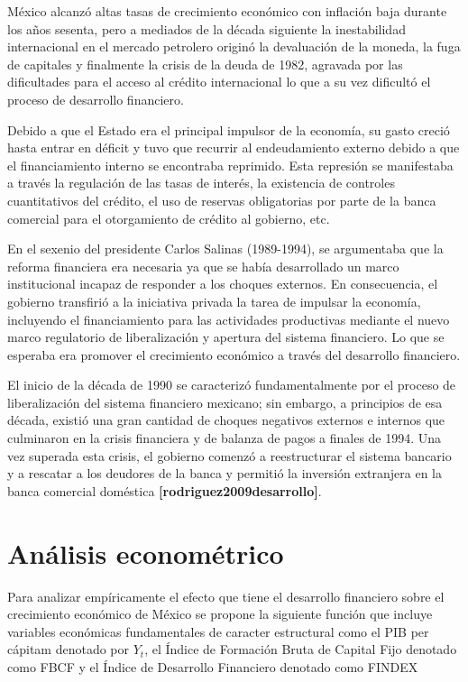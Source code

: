 \documentclass[]{AEA}
\begin{document}
México alcanzó altas tasas de crecimiento económico con inflación baja
durante los años sesenta, pero a mediados de la década siguiente la
inestabilidad internacional en el mercado petrolero originó la
devaluación de la moneda, la fuga de capitales y finalmente la crisis de
la deuda de 1982, agravada por las dificultades para el acceso al
crédito internacional lo que a su vez dificultó el proceso de desarrollo
financiero.

Debido a que el Estado era el principal impulsor de la economía, su
gasto creció hasta entrar en déficit y tuvo que recurrir al
endeudamiento externo debido a que el financiamiento interno se
encontraba reprimido. Esta represión se manifestaba a través la
regulación de las tasas de interés, la existencia de controles
cuantitativos del crédito, el uso de reservas obligatorias por parte de
la banca comercial para el otorgamiento de crédito al gobierno, etc.

En el sexenio del presidente Carlos Salinas (1989-1994), se argumentaba
que la reforma financiera era necesaria ya que se había desarrollado un
marco institucional incapaz de responder a los choques externos. En
consecuencia, el gobierno transfirió a la iniciativa privada la tarea de
impulsar la economía, incluyendo el financiamiento para las actividades
productivas mediante el nuevo marco regulatorio de liberalización y
apertura del sistema financiero. Lo que se esperaba era promover el
crecimiento económico a través del desarrollo financiero.

El inicio de la década de 1990 se caracterizó fundamentalmente por el
proceso de liberalización del sistema financiero mexicano; sin embargo,
a principios de esa década, existió una gran cantidad de choques
negativos externos e internos que culminaron en la crisis financiera y
de balanza de pagos a finales de 1994. Una vez superada esta crisis, el
gobierno comenzó a reestructurar el sistema bancario y a rescatar a los
deudores de la banca y permitió la inversión extranjera en la banca
comercial doméstica \textbf{{[}rodriguez2009desarrollo{]}}.

\section{Análisis econométrico}

Para analizar empíricamente el efecto que tiene el desarrollo financiero
sobre el crecimiento económico de México se propone la siguiente función
que incluye variables económicas fundamentales de caracter estructural
como el PIB per cápitam denotado por \(Y_{t}\), el Índice de Formación
Bruta de Capital Fijo denotado como FBCF y el Índice de Desarrollo
Financiero denotado como FINDEX
\end{document}
